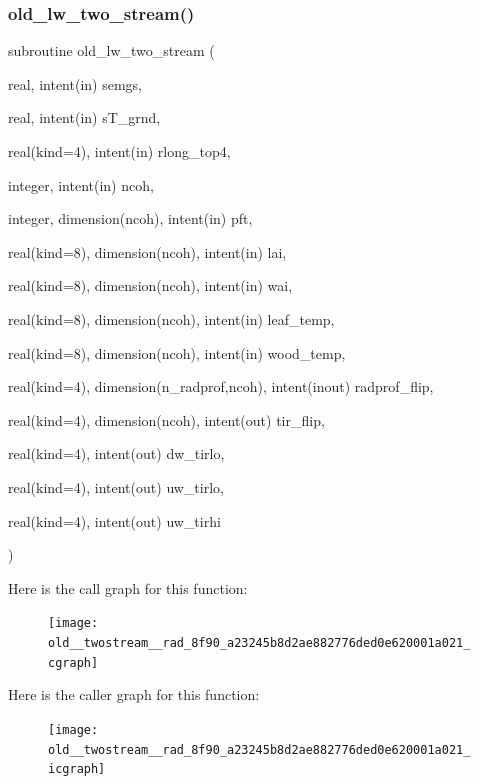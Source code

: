 \subsubsection{\texorpdfstring{old\+\_\+lw\+\_\+two\+\_\+stream()}{old\_lw\_two\_stream()}}
{\footnotesize\ttfamily subroutine old\+\_\+lw\+\_\+two\+\_\+stream (\begin{DoxyParamCaption}\item[{real, intent(in)}]{semgs,  }\item[{real, intent(in)}]{s\+T\+\_\+grnd,  }\item[{real(kind=4), intent(in)}]{rlong\+\_\+top4,  }\item[{integer, intent(in)}]{ncoh,  }\item[{integer, dimension(ncoh), intent(in)}]{pft,  }\item[{real(kind=8), dimension(ncoh), intent(in)}]{lai,  }\item[{real(kind=8), dimension(ncoh), intent(in)}]{wai,  }\item[{real(kind=8), dimension(ncoh), intent(in)}]{leaf\+\_\+temp,  }\item[{real(kind=8), dimension(ncoh), intent(in)}]{wood\+\_\+temp,  }\item[{real(kind=4), dimension(n\+\_\+radprof,ncoh), intent(inout)}]{radprof\+\_\+flip,  }\item[{real(kind=4), dimension(ncoh), intent(out)}]{tir\+\_\+flip,  }\item[{real(kind=4), intent(out)}]{dw\+\_\+tirlo,  }\item[{real(kind=4), intent(out)}]{uw\+\_\+tirlo,  }\item[{real(kind=4), intent(out)}]{uw\+\_\+tirhi }\end{DoxyParamCaption})}

Here is the call graph for this function\+:
\nopagebreak
\begin{figure}[H]
\begin{center}
\leavevmode
\texttt{[image: old\_\_twostream\_\_rad\_8f90\_a23245b8d2ae882776ded0e620001a021\_cgraph]}
\end{center}
\end{figure}
Here is the caller graph for this function\+:
\nopagebreak
\begin{figure}[H]
\begin{center}
\leavevmode
\texttt{[image: old\_\_twostream\_\_rad\_8f90\_a23245b8d2ae882776ded0e620001a021\_icgraph]}
\end{center}
\end{figure}
\mbox{\label{old__twostream__rad_8f90_a836a0d64d7bb3262bb85a0234cb36bea}} 
